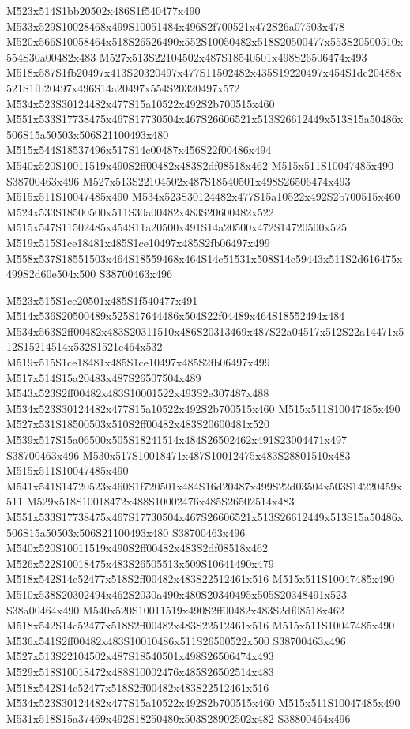\documentclass{article}
\begin{document}
\begin{multicols}{2}
M523x514S1bb20502x486S1f540477x490 M533x529S10028468x499S10051484x496S2f700521x472S26a07503x478 M520x566S10058464x518S26526490x552S10050482x518S20500477x553S20500510x554S30a00482x483 M527x513S22104502x487S18540501x498S26506474x493 M518x587S1fb20497x413S20320497x477S11502482x435S19220497x454S1dc20488x521S1fb20497x496S14a20497x554S20320497x572 M534x523S30124482x477S15a10522x492S2b700515x460 M551x533S17738475x467S17730504x467S26606521x513S26612449x513S15a50486x506S15a50503x506S21100493x480 M515x544S18537496x517S14c00487x456S22f00486x494 M540x520S10011519x490S2ff00482x483S2df08518x462 M515x511S10047485x490 S38700463x496 M527x513S22104502x487S18540501x498S26506474x493 M515x511S10047485x490 M534x523S30124482x477S15a10522x492S2b700515x460 M524x533S18500500x511S30a00482x483S20600482x522 M515x547S11502485x454S11a20500x491S14a20500x472S14720500x525 M519x515S1ce18481x485S1ce10497x485S2fb06497x499 M558x537S18551503x464S18559468x464S14c51531x508S14c59443x511S2d616475x499S2d60e504x500 S38700463x496

M523x515S1ce20501x485S1f540477x491 M514x536S20500489x525S17644486x504S22f04489x464S18552494x484 M534x563S2ff00482x483S20311510x486S20313469x487S22a04517x512S22a14471x512S15214514x532S1521c464x532 M519x515S1ce18481x485S1ce10497x485S2fb06497x499 M517x514S15a20483x487S26507504x489 M543x523S2ff00482x483S10001522x493S2e307487x488 M534x523S30124482x477S15a10522x492S2b700515x460 M515x511S10047485x490 M527x531S18500503x510S2ff00482x483S20600481x520 M539x517S15a06500x505S18241514x484S26502462x491S23004471x497 S38700463x496 M530x517S10018471x487S10012475x483S28801510x483 M515x511S10047485x490 M541x541S14720523x460S1f720501x484S16d20487x499S22d03504x503S14220459x511 M529x518S10018472x488S10002476x485S26502514x483 M551x533S17738475x467S17730504x467S26606521x513S26612449x513S15a50486x506S15a50503x506S21100493x480 S38700463x496 M540x520S10011519x490S2ff00482x483S2df08518x462 M526x522S10018475x483S26505513x509S10641490x479 M518x542S14c52477x518S2ff00482x483S22512461x516 M515x511S10047485x490 M510x538S20302494x462S2030a490x480S20340495x505S20348491x523 S38a00464x490 M540x520S10011519x490S2ff00482x483S2df08518x462 M518x542S14c52477x518S2ff00482x483S22512461x516 M515x511S10047485x490 M536x541S2ff00482x483S10010486x511S26500522x500 S38700463x496 M527x513S22104502x487S18540501x498S26506474x493 M529x518S10018472x488S10002476x485S26502514x483 M518x542S14c52477x518S2ff00482x483S22512461x516 M534x523S30124482x477S15a10522x492S2b700515x460 M515x511S10047485x490 M531x518S15a37469x492S18250480x503S28902502x482 S38800464x496


\end{multicols}
\end{document}
